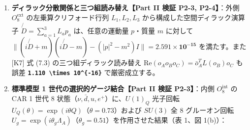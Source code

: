 \documentclass[
  a4paper,
]{ltjsarticle}
\providecommand{\tightlist}{%
  \setlength{\itemsep}{0pt}\setlength{\parskip}{0pt}}
\begin{document}
\begin{enumerate}
\def\labelenumi{\arabic{enumi}.}
\tightlist
\item
  \textbf{ディラック分散関係と三つ組読み替え【Part II 検証 P2-3,
  P2-4】}：外側 \(O_8^{\mathrm{ext}}\) の左乗算クリフォード行列
  \(L_1, L_2, L_3\) から構成した空間ディラック演算子
  \(\not{D} = \sum_{a=1}^3 L_a p_a\) は、任意の運動量 \(p\)・質量 \(m\)
  に対して
  \(\|(i\not{D} + m)(i\not{D} - m) - (|p|^2 - m^2)I\| = \mathbf{2.591 \times 10^{-15}}\)
  を満たす。また {[}K7{]} 式 (7.3) の三つ組ディラック読み替え
  \(\mathrm{Re}(o_A o_B o_C) = \bar{o}_A^T L(o_B) o_C\) も誤差
  \textbf{\texttt{1.110\ \textbackslash{}times\ 10\^{}\{-16\}}}
  で厳密成立する。
\item
  \textbf{標準模型 1 世代の選択的ゲージ結合【Part II 検証 P2-3】}：内側
  \(O_8^{\mathrm{int}}\) の CAR 1 世代 8
  状態（\(\nu, \bar{d}, u, e^+\)）に、\(U(1)_Q\) 光子回転
  \(U_Q(\theta) = \exp(i\theta Q)\)（\(\theta = 0.73\)）および \(SU(3)\)
  全 8 グルーオン回転
  \(U_g = \exp(i\theta_g \Lambda_A)\)（\(\theta_g = 0.51\)）を作用させた結果（表
  1、図 1(b)）：
\end{enumerate}
\end{document}
